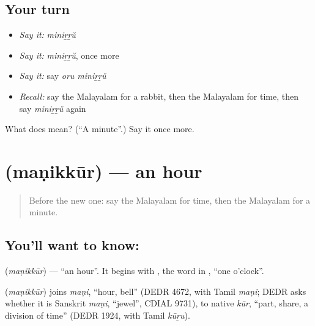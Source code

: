 \subsection*{Your turn}
\begin{itemize}
\raggedright
  \item \emph{Say it:} \emph{miniṟṟŭ}
  \item \emph{Say it:} \emph{miniṟṟŭ}, once more
  \item \emph{Say it:} say \emph{oru miniṟṟŭ}
  \item \emph{Recall:} say the Malayalam for a rabbit, then the Malayalam for time, then say \emph{miniṟṟŭ} again
\end{itemize}

\begin{tcolorbox}[breakable,colback=teal!4,colframe=teal!35!black,title={Before you move on}]
What does  mean? (\textquotedblleft{}A minute\textquotedblright{}.) Say it once more.
\end{tcolorbox}
\section[\texorpdfstring{\ml{മണിക്കൂർ} (maṇikkūr)}{മണിക്കൂർ (maṇikkūr)}]{ (maṇikkūr) — an hour}

\label{lesson:ML-C139-hour}



\begin{quote}
Before the new one: say the Malayalam for time, then the Malayalam for a minute.
\end{quote}

\subsection*{You'll want to know: }
\textbf{} (\emph{maṇikkūr}) — \textquotedblleft{}an hour\textquotedblright{}. It begins with \textbf{}, the word in \textbf{ }, \textquotedblleft{}one o'clock\textquotedblright{}.

\begin{cousinweb}
\textbf{} (\emph{maṇikkūr}) joins \emph{maṇi}, \textquotedblleft{}hour, bell\textquotedblright{} (DEDR 4672, with Tamil \emph{maṇi}; DEDR asks whether it is Sanskrit \emph{maṇi}, \textquotedblleft{}jewel\textquotedblright{}, CDIAL 9731), to native \emph{kūr}, \textquotedblleft{}part, share, a division of time\textquotedblright{} (DEDR 1924, with Tamil \emph{kūṟu}).
\end{cousinweb}

